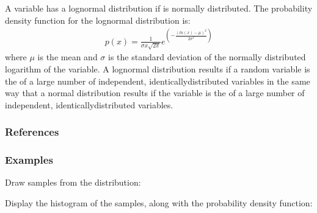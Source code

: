 \documentclass[letterpaper,10pt,english]{sphinxmanual}
\begin{document}
\begin{fulllineitems}
\sphinxAtStartPar
A variable  has a log\sphinxhyphen{}normal distribution if  is normally
distributed.  The probability density function for the log\sphinxhyphen{}normal
distribution is:
\begin{equation*}
\begin{split}p(x) = \frac{1}{\sigma x \sqrt{2\pi}}
e^{(-\frac{(ln(x)-\mu)^2}{2\sigma^2})}\end{split}
\end{equation*}
\sphinxAtStartPar
where \(\mu\) is the mean and \(\sigma\) is the standard
deviation of the normally distributed logarithm of the variable.
A log\sphinxhyphen{}normal distribution results if a random variable is the 
of a large number of independent, identically\sphinxhyphen{}distributed variables in
the same way that a normal distribution results if the variable is the
 of a large number of independent, identically\sphinxhyphen{}distributed
variables.
\subsubsection*{References}
\subsubsection*{Examples}

\sphinxAtStartPar
Draw samples from the distribution:

\begin{sphinxVerbatim}[commandchars=\\\{\}]
     
    
\end{sphinxVerbatim}

\sphinxAtStartPar
Display the histogram of the samples, along with
the probability density function:

\begin{sphinxVerbatim}[commandchars=\\\{\}]
   
       
\end{sphinxVerbatim}


\end{fulllineitems}
\end{document}
